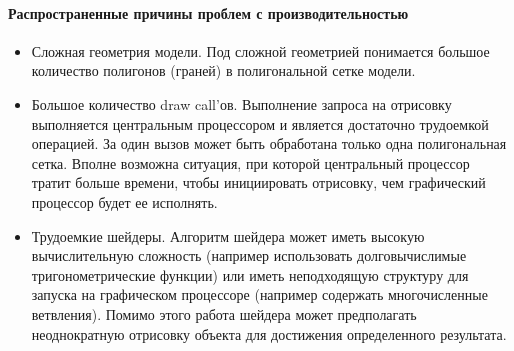 ﻿\paragraph{Распространенные причины проблем с производительностью}

\begin{itemize}
    \item {
        Сложная геометрия модели. Под сложной геометрией понимается
        большое количество полигонов (граней) в полигональной сетке модели.
    }
    \item {
        Большое количество draw call'ов.
        Выполнение запроса на отрисовку выполняется центральным процессором и
        является достаточно трудоемкой операцией. За один вызов может быть
        обработана только одна полигональная сетка.
        Вполне возможна ситуация, при которой центральный процессор тратит больше времени,
        чтобы инициировать отрисовку, чем графический процессор будет ее исполнять.
    }
    \item {
        Трудоемкие шейдеры. Алгоритм шейдера может иметь
        высокую вычислительную сложность
        (например использовать долговычислимые тригонометрические функции) или
        иметь неподходящую структуру для запуска на графическом процессоре
        (например содержать многочисленные ветвления).
        Помимо этого работа шейдера может предполагать неоднократную
        отрисовку объекта для достижения определенного результата.
    }
\end{itemize}
